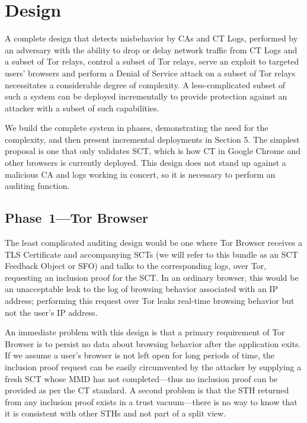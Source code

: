 \section{Design} \label{sec:base}

A complete design that detects misbehavior by CAs and CT Logs, performed by an adversary with the ability to drop or delay network traffic from CT Logs and a subset of Tor relays, control a subset of Tor relays, serve an exploit to targeted users' browsers and perform a Denial of Service attack on a subset of Tor relays necessitates a considerable degree of complexity. A less-complicated subset of such a system can be deployed incrementally to provide protection against an attacker with a subset of such capabilities.

We build the complete system in phases, demonstrating the need for the complexity, and then present incremental deployments in Section 5. The simplest proposal is one that only validates SCT, which is how CT in Google Chrome and other browsers is currently deployed. This design does not stand up against a malicious CA and logs working in concert, so it is necessary to perform an auditing function.

\subsection{Phase~1---Tor Browser} \label{sec:base:phase1}

The least complicated auditing design would be one where Tor Browser receives a TLS Certificate and accompanying SCTs (we will refer to this bundle as an SCT Feedback Object or SFO) and talks to the corresponding logs, over Tor, requesting an inclusion proof for the SCT. In an ordinary browser, this would be an unacceptable leak to the log of browsing behavior associated with an IP address; performing this request over Tor leaks real-time browsing behavior but not the user's IP address.

An immediate problem with this design is that a primary requirement of Tor Browser is to persist no data about browsing behavior after the application exits. If we assume a user's browser is not left open for long periods of time, the inclusion proof request can be easily circumvented by the attacker by supplying a fresh SCT whose MMD has not completed---thus no inclusion proof can be provided as per the CT standard. A second problem is that the STH returned from any inclusion proof exists in a trust vacuum---there is no way to know that it is consistent with other STHs and not part of a split view.

